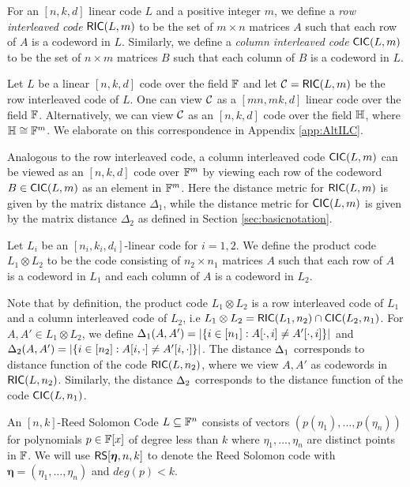 \begin{definition}\label{defn:interleavedcode}
For an $[n,k,d]$ linear code $L$ and a positive integer $m$, we define a {\em row interleaved code} $\mathsf{RIC}(L,m)$ to be the set of $m\times n$ matrices $A$ such that each row of $A$ is a codeword in $L$. Similarly, we define a {\em column interleaved code} $\mathsf{CIC}(L,m)$ to be the set of $n\times m$ matrices $B$ such that each column of $B$ is a codeword in $L$.
\end{definition}

Let $L$ be a linear $[n,k,d]$ code over the field $\mathbb{F}$ and let
$\mathcal{C}=\mathsf{RIC}(L,m)$ be the row interleaved code of $L$. One can view $\mathcal{C}$ as
a $[mn,mk,d]$ linear code over the field $\mathbb{F}$. Alternatively, we can view
$\mathcal{C}$ as an $[n,k,d]$ code over the field $\mathbb{H}$, where $\mathbb{H}\cong \mathbb{F}^m$. We
elaborate on this correspondence in Appendix \ref{app:AltILC}.

Analogous to the row interleaved code, a column interleaved code $\mathsf{CIC}(L,m)$ 
can be viewed as an $[n,k,d]$ code over $\mathbb{F}^m$ by viewing each row of the
codeword $B\in \mathsf{CIC}(L,m)$ as an element in $\mathbb{F}^m$. Here the distance metric
for $\mathsf{RIC}(L,m)$ is given by the matrix distance $\Delta_1$, while the distance
metric for $\mathsf{CIC}(L,m)$ is given by the matrix distance $\Delta_2$ as defined in
Section \ref{sec:basicnotation}.  
 
\begin{definition}\label{defn:productcode}
Let $L_i$ be an $[n_i,k_i,d_i]$-linear code for $i=1,2$. We define the product
code $L_1\otimes L_2$ to be the code consisting of $n_2\times n_1$ matrices $A$
such that each row of $A$ is a codeword in $L_1$ and each column of $A$ is a
codeword in $L_2$.
\end{definition}

Note that by definition, the product code $L_1\otimes L_2$ is a row interleaved
code of $L_1$ and a column interleaved code of $L_2$, i.e $L_1\otimes L_2 =
\mathsf{RIC}(L_1,n_2)\cap \mathsf{CIC}(L_2,n_1)$. For $A,A'\in L_1\otimes L_2$, we define
$\Delta_1(A,A')=|\{i\in [n_1]: A[\cdot,i]\neq A'[\cdot,i]\}|$ and
$\Delta_2(A,A')=|\{i\in [n_2]: A[i,\cdot]\neq A'[i,\cdot]\}|$. The distance
$\Delta_1$ corresponds to distance function of the code $\mathsf{RIC}(L,n_2)$, where we
view $A,A'$ as codewords in $\mathsf{RIC}(L,n_2)$. Similarly, the distance $\Delta_2$
corresponds to the distance function of the code $\mathsf{CIC}(L,n_1)$.

\begin{definition}\label{defn:rscode}
An $[n,k]$-Reed Solomon Code $L\subseteq \mathbb{F}^n$ consists of vectors
$(p(\eta_1),\ldots,p(\eta_n))$ for polynomials $p\in \mathbb{F}[x]$ of degree less
than $k$ where $\eta_1,\ldots,\eta_n$ are distinct points in $\mathbb{F}$. We will use
$\mathsf{RS}[\bm{\eta},n,k]$  to denote the Reed Solomon code with
$\bm{\eta}=(\eta_1,\ldots,\eta_n)$ and $deg(p)<k$. 
\end{definition}

